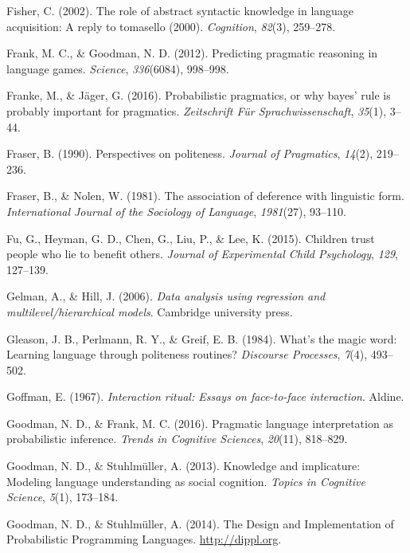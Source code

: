 \documentclass[oneside]{report}
\begin{document}
\hypertarget{ref-fisher2002}{}
Fisher, C. (2002). The role of abstract syntactic knowledge in language
acquisition: A reply to tomasello (2000). \emph{Cognition},
\emph{82}(3), 259--278.

\hypertarget{ref-frank2012}{}
Frank, M. C., \& Goodman, N. D. (2012). Predicting pragmatic reasoning
in language games. \emph{Science}, \emph{336}(6084), 998--998.

\hypertarget{ref-franke2016}{}
Franke, M., \& Jäger, G. (2016). Probabilistic pragmatics, or why bayes'
rule is probably important for pragmatics. \emph{Zeitschrift Für
Sprachwissenschaft}, \emph{35}(1), 3--44.

\hypertarget{ref-fraser1990}{}
Fraser, B. (1990). Perspectives on politeness. \emph{Journal of
Pragmatics}, \emph{14}(2), 219--236.

\hypertarget{ref-fraser1981}{}
Fraser, B., \& Nolen, W. (1981). The association of deference with
linguistic form. \emph{International Journal of the Sociology of
Language}, \emph{1981}(27), 93--110.

\hypertarget{ref-fu2015}{}
Fu, G., Heyman, G. D., Chen, G., Liu, P., \& Lee, K. (2015). Children
trust people who lie to benefit others. \emph{Journal of Experimental
Child Psychology}, \emph{129}, 127--139.

\hypertarget{ref-gelman2006data}{}
Gelman, A., \& Hill, J. (2006). \emph{Data analysis using regression and
multilevel/hierarchical models}. Cambridge university press.

\hypertarget{ref-gleason1984}{}
Gleason, J. B., Perlmann, R. Y., \& Greif, E. B. (1984). What's the
magic word: Learning language through politeness routines?
\emph{Discourse Processes}, \emph{7}(4), 493--502.

\hypertarget{ref-goffman1967}{}
Goffman, E. (1967). \emph{Interaction ritual: Essays on face-to-face
interaction}. Aldine.

\hypertarget{ref-goodman2016}{}
Goodman, N. D., \& Frank, M. C. (2016). Pragmatic language
interpretation as probabilistic inference. \emph{Trends in Cognitive
Sciences}, \emph{20}(11), 818--829.

\hypertarget{ref-goodman2013}{}
Goodman, N. D., \& Stuhlmüller, A. (2013). Knowledge and implicature:
Modeling language understanding as social cognition. \emph{Topics in
Cognitive Science}, \emph{5}(1), 173--184.

\hypertarget{ref-dippl}{}
Goodman, N. D., \& Stuhlmüller, A. (2014). The Design and Implementation
of Probabilistic Programming Languages. \url{http://dippl.org}.
\end{document}
